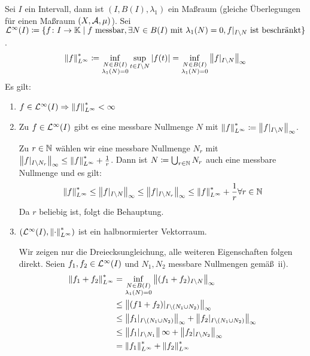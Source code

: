 \begin{beispiel*}
Sei $ I $ ein Intervall, dann ist $ (I,B(I),\lambda_1) $ ein Ma\ss raum (gleiche \"Uberlegungen f\"ur einen Ma\ss raum $ (X,\mathcal A,\mu) $). Sei $ \mathcal L^\infty(I)\coloneqq\lbrace f\colon I\rightarrow\mathbb{K}\mid f\text{ messbar}, \exists N\in B(I)\text{ mit }\lambda_1(N)=0, f|_{I\setminus N} \text{ ist beschr\"ankt}\rbrace $.
\[ \left\|f\right\|^\ast_{L^\infty}\coloneqq\inf_{\substack{N\in B(I)\\\lambda_1(N)=0}}\sup_{t\in I\setminus N}|f(t)|=\inf_{\substack{N\in B(I)\\\lambda_1(N)=0}}\left\|f|_{I\setminus N}\right\|_\infty \]
Es gilt:
\begin{enumerate}
\item $ f\in\mathcal L^\infty(I)\Rightarrow\left\|f\right\|^\ast_{L^\infty}<\infty $
\item Zu $ f\in\mathcal L^\infty(I) $ gibt es eine messbare Nullmenge $ N $ mit $ \left\|f\right\|^\ast_{L^\infty}\coloneqq\left\|f|_{I\setminus N}\right\|_\infty $.
\begin{beweis}
Zu $ r\in\mathbb{N} $ w\"ahlen wir eine messbare Nullmenge $ N_r $ mit $ \left\|f|_{I\setminus N_r}\right\|_\infty\leq\left\|f\right\|^\ast_{L^\infty}+\frac{1}{r} $. Dann ist $ N\coloneqq\bigcup_{r\in\mathbb{N}}N_r $ auch eine messbare Nullmenge und es gilt:
\[ \left\|f\right\|_{L^\infty}^\ast\leq \left\|f|_{I\setminus N}\right\|_\infty\leq\left\|f|_{I\setminus N_r}\right\|_\infty\leq\left\|f\right\|_{L^\infty}^\ast+\frac{1}{r}\forall r\in\mathbb{N} \]
Da $ r $ beliebig ist, folgt die Behauptung.
\end{beweis}
\item $ (\mathcal L^\infty(I),\left\|\cdot\right\|^\ast_{L^\infty}) $ ist ein halbnormierter Vektorraum.
\begin{beweis}
Wir zeigen nur die Dreiecksungleichung, alle weiteren Eigenschaften folgen direkt. Seien $ f_1, f_2\in\mathcal L^\infty(I) $ und $ N_1, N_2 $ messbare Nullmengen gem\"a\ss\ ii).
\begin{align*} \left\|f_1+f_2\right\|^\ast_{L^\infty}&=\inf_{\substack{N\in B(I)\\\lambda_1(N)=0}}\left\|(f_1+f_2)_{I\setminus N}\right\|_\infty\\&\leq\left\|(f1+f_2)|_{I\setminus(N_1\cup N_2)}\right\|_\infty\\&\leq\left\|f_1|_{I\setminus(N_1\cup N_2)}\right\|_\infty+\left\|f_2|_{I\setminus(N_1\cup N_2)}\right\|_\infty\\&\leq\left\|f_1|_{I\setminus N_1}\right\|\infty+\left\|f_2|_{I\setminus N_2}\right\|_\infty\\&=\left\|f_1\right\|^\ast_{L^\infty}+\left\|f_2\right\|^\ast_{L^\infty} \end{align*}

\end{beweis}
\end{enumerate}
\end{beispiel*}
